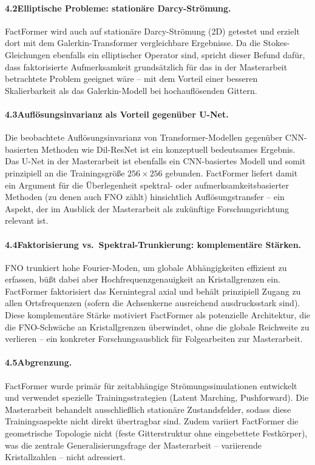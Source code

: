\documentclass[a4paper,12pt]{article}
\begin{document}
\paragraph{4.2\quad Elliptische Probleme: stationäre Darcy-Strömung.}
FactFormer wird auch auf stationäre Darcy-Strömung (2D) getestet und erzielt dort
mit dem Galerkin-Transformer vergleichbare Ergebnisse. Da die Stokes-Gleichungen
ebenfalls ein elliptischer Operator sind, spricht dieser Befund dafür, dass
faktorisierte Aufmerksamkeit grundsätzlich für das in der Masterarbeit betrachtete
Problem geeignet wäre -- mit dem Vorteil einer besseren Skalierbarkeit als
das Galerkin-Modell bei hochauflösenden Gittern.

\paragraph{4.3\quad Auflösungsinvarianz als Vorteil gegenüber U-Net.}
Die beobachtete Auflösungsinvarianz von Transformer-Modellen gegenüber
CNN-basierten Methoden wie Dil-ResNet ist ein konzeptuell bedeutsames Ergebnis.
Das U-Net in der Masterarbeit ist ebenfalls ein CNN-basiertes Modell und somit
prinzipiell an die Trainingsgröße $256 \times 256$ gebunden. FactFormer liefert
damit ein Argument für die Überlegenheit spektral- oder aufmerksamkeitsbasierter
Methoden (zu denen auch FNO zählt) hinsichtlich Auflösungstransfer -- ein Aspekt,
der im Ausblick der Masterarbeit als zukünftige Forschungsrichtung relevant ist.

\paragraph{4.4\quad Faktorisierung vs.\ Spektral-Trunkierung: komplementäre Stärken.}
FNO trunkiert hohe Fourier-Moden, um globale Abhängigkeiten effizient zu erfassen,
büßt dabei aber Hochfrequenzgenauigkeit an Kristallgrenzen ein. FactFormer
faktorisiert das Kernintegral axial und behält prinzipiell Zugang zu allen
Ortsfrequenzen (sofern die Achsenkerne ausreichend ausdrucksstark sind).
Diese komplementäre Stärke motiviert FactFormer als potenzielle Architektur,
die die FNO-Schwäche an Kristallgrenzen überwindet, ohne die globale Reichweite
zu verlieren -- ein konkreter Forschungsausblick für Folgearbeiten zur Masterarbeit.

\paragraph{4.5\quad Abgrenzung.}
FactFormer wurde primär für zeitabhängige Strömungssimulationen entwickelt und
verwendet spezielle Trainingsstrategien (Latent Marching, Pushforward). Die
Masterarbeit behandelt ausschließlich stationäre Zustandsfelder, sodass diese
Trainingsaspekte nicht direkt übertragbar sind. Zudem variiert FactFormer die
geometrische Topologie nicht (feste Gitterstruktur ohne eingebettete Festkörper),
was die zentrale Generalisierungsfrage der Masterarbeit -- variierende Kristallzahlen
-- nicht adressiert.
\end{document}
